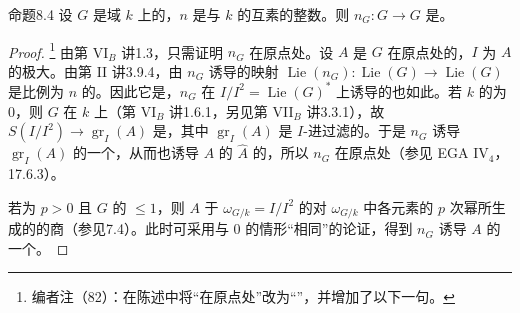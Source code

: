 \begin{SGAresult}{命题}{8.4}
设 $G$ 是域 $k$ 上的，$n$ 是与 $k$ 的互素的整数。则 $n_G:G\to G$ 是。
\end{SGAresult}
\begin{proof}
\footnote{编者注（82）：在陈述中将“在原点处”改为“”，并增加了以下一句。}
由第 VI$_B$ 讲1.3，只需证明 $n_G$ 在原点处。设 $A$ 是 $G$ 在原点处的，$I$ 为 $A$ 的极大。由第 II 讲3.9.4，由 $n_G$ 诱导的映射 $\operatorname{Lie}(n_G):\operatorname{Lie}(G)\to\operatorname{Lie}(G)$ 是比例为 $n$ 的。因此它是，$n_G$ 在 $I/I^2=\operatorname{Lie}(G)^*$ 上诱导的也如此。若 $k$ 的为 $0$，则 $G$ 在 $k$ 上（第 VI$_B$ 讲1.6.1，另见第 VII$_B$ 讲3.3.1），故 $S(I/I^2)\to\operatorname{gr}_I(A)$ 是，其中 $\operatorname{gr}_I(A)$ 是 $I$-进过滤的。于是 $n_G$ 诱导 $\operatorname{gr}_I(A)$ 的一个，从而也诱导 $A$ 的 $\widehat A$ 的，所以 $n_G$ 在原点处（参见 EGA IV$_4$，17.6.3）。

若为 $p>0$ 且 $G$ 的 $\le1$，则 $A$ 于 $\omega_{G/k}=I/I^2$ 的对 $\omega_{G/k}$ 中各元素的 $p$ 次幂所生成的的商（参见7.4）。此时可采用与 $0$ 的情形“相同”的论证，得到 $n_G$ 诱导 $A$ 的一个。


\end{proof}
